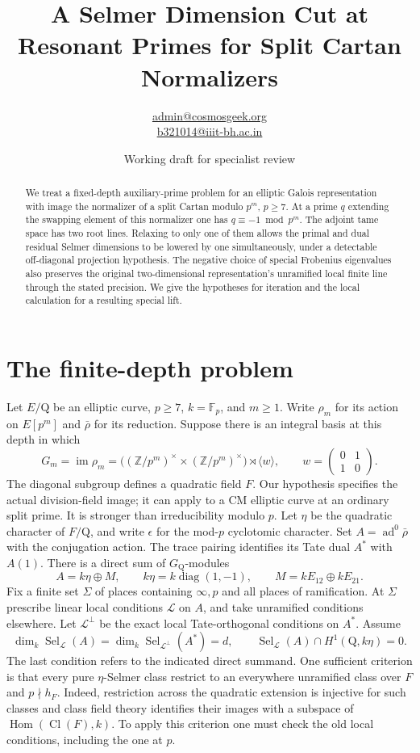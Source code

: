 \documentclass[11pt]{article}
\title{A Selmer Dimension Cut at Resonant Primes for Split Cartan Normalizers}
\author{\small\href{mailto:admin@cosmosgeek.org}{admin@cosmosgeek.org}\\
\small\href{mailto:b321014@iiit-bh.ac.in}{b321014@iiit-bh.ac.in}}
\date{Working draft for specialist review}
\newcommand{\F}{\mathbb F}
\newcommand{\Q}{\mathrm{Q}}
\newcommand{\Sel}{\operatorname{Sel}}
\begin{document}
\maketitle
\begin{abstract}
We treat a fixed-depth auxiliary-prime problem for an elliptic
Galois representation with image the normalizer of a split Cartan
modulo $p^m$, $p\ge7$. At a prime $q$ extending the swapping
element of this normalizer one has $q\equiv-1\bmod p^m$.
The adjoint tame space has two root lines. Relaxing to only one
of them allows the primal and dual residual Selmer dimensions
to be lowered by one simultaneously, under a detectable
off-diagonal projection hypothesis. The negative choice of
special Frobenius eigenvalues also preserves the original
two-dimensional representation's unramified local finite line
through the stated precision. We give the hypotheses for iteration
and the local calculation for a resulting special lift.
\end{abstract}

\section{The finite-depth problem}
Let $E/\Q$ be an elliptic curve, $p\ge7$, $k=\F_p$, and $m\ge1$.
Write $\rho_m$ for its action on $E[p^m]$ and $\bar\rho$ for
its reduction. Suppose there is an integral basis at this depth
in which
\[
 G_m=\operatorname{im}\rho_m
  =\bigl((\mathbb Z/p^m)^\times\times(\mathbb Z/p^m)^\times\bigr)
                         \rtimes\langle w\rangle,\qquad
 w=\begin{pmatrix}0&1\\1&0\end{pmatrix}.
\]
The diagonal subgroup defines a quadratic field $F$. Our hypothesis
specifies the actual division-field image; it can apply to a CM
elliptic curve at an ordinary split prime. It is stronger than
irreducibility modulo $p$. Let $\eta$ be the quadratic character
of $F/\Q$, and write $\epsilon$ for the mod-$p$ cyclotomic character.
Set $A=\operatorname{ad}^0\bar\rho$ with the conjugation action.
The trace pairing identifies its Tate dual $A^*$ with $A(1)$.
There is a direct sum of $G_{\Q}$-modules
\[
 A=k\eta\oplus M,\qquad
 k\eta=k\operatorname{diag}(1,-1),\qquad
 M=kE_{12}\oplus kE_{21}.
\]
Fix a finite set $\Sigma$ of places containing $\infty,p$ and all
places of ramification. At $\Sigma$ prescribe linear local
conditions $\mathcal L$ on $A$, and take unramified conditions
elsewhere. Let $\mathcal L^\perp$ be the exact local Tate-orthogonal
conditions on $A^*$. Assume
\[
 \dim_k\Sel_{\mathcal L}(A)
 =\dim_k\Sel_{\mathcal L^\perp}(A^*)=d,\qquad
 \Sel_{\mathcal L}(A)\cap H^1(\Q,k\eta)=0.
 \tag{1}
\]
The last condition refers to the indicated direct summand. One
sufficient criterion is that every pure $\eta$-Selmer class restrict
to an everywhere unramified class over $F$ and $p\nmid h_F$. Indeed,
restriction across the quadratic extension is injective for such
classes and class field theory identifies their images with a
subspace of $\operatorname{Hom}(\operatorname{Cl}(F),k)$.
To apply this criterion one must check the old local conditions,
including the one at $p$.
\end{document}
